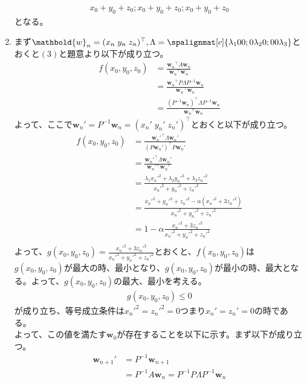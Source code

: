 \begin{enumerate}[(1)]
\begin{align*}
{					{x_0 + y_0 + z_0};
					{x_0 + y_0 + z_0};
					{x_0 + y_0 + z_0}
				}
			\end{align*}
			となる。
	\item まず$\mathbold{w}_n = (x_n\;y_n\; z_n)^{\top}, \Lambda = \spalignmat[c]{
		{\lambda_1} {0} {0};
		{0} {\lambda_2} {0};
		{0} {0} {\lambda_3}
		}$とおくと$(3)$と題意より以下が成り立つ。
		\begin{align*}
			f(x_0, y_0, z_0) &= \frac{\mathbold{w}_n{}^{\top} A \mathbold{w}_n}{\mathbold{w}_n{}^{\top}\mathbold{w}_n}\\
			&= \frac{\mathbold{w}_n{}^{\top} P \Lambda P^{-1} \mathbold{w}_n}{\mathbold{w}_n{}^{\top}\mathbold{w}_n}\\
			&= \frac{\left(P^{-1}\mathbold{w}_n\right)^{\top} \Lambda P^{-1} \mathbold{w}_n}{\mathbold{w}_n{}^{\top}\mathbold{w}_n}
		\end{align*}
		よって、ここで$\mathbold{w}_n' = P^{-1}\mathbold{w}_n = (x_n'\;y_n'\; z_n')^{\top}$とおくと以下が成り立つ。
		\begin{align*}
			f(x_0, y_0, z_0) &= \frac{\mathbold{w}_n'^{\top} \Lambda \mathbold{w}_n'}{\left(P\mathbold{w}_n'\right)^{\top}P\mathbold{w}_n'}\\
			&= \frac{\mathbold{w}_n'^{\top} \Lambda \mathbold{w}_n'}{\mathbold{w}_n'{}^{\top}\mathbold{w}_n'}\\
			&= \frac{\lambda_1 x_n'^2 + \lambda_2 y_n'^2 + \lambda_3 z_n'^2}{x_n'^2 + y_n'^2 + z_n'^2}\\
			&= \frac{x_n'^2 + y_n'^2 + z_n'^2 - \alpha(x_n'^2 + 3z_n'^2)}{x_n'^2 + y_n'^2 + z_n'^2}\\
			&= 1 - \alpha\frac{x_n'^2 + 3z_n'^2}{x_n'^2 + y_n'^2 + z_n'^2}\\
		\end{align*}
		よって、$g(x_0, y_0, z_0) = \frac{x_n'^2 + 3z_n'^2}{x_n'^2 + y_n'^2 + z_n'^2}$とおくと、$f(x_0, y_0, z_0)$は
		$g(x_0, y_0, z_0)$が最大の時、最小となり、$g(x_0, y_0, z_0)$が最小の時、最大となる。よって、$g(x_0, y_0, z_0)$の最大、最小を考える。
		\begin{align*}
			g(x_0, y_0, z_0) \leq 0
		\end{align*}
		が成り立ち、等号成立条件は$x_n'^2 = z_n'^2 = 0$つまり$x_n' = z_n' = 0$の時である。\\
		よって、この値を満たす$\mathbold{w}_0$が存在することを以下に示す。まず以下が成り立つ。
		\begin{align*}
			\mathbold{w}_{n + 1}' &= P^{-1}\mathbold{w}_{n + 1}\\
			&= P^{-1}A\mathbold{w}_n = P^{-1}P\Lambda P^{-1}\mathbold{w}_n\\

\end{align*}
\end{enumerate}
